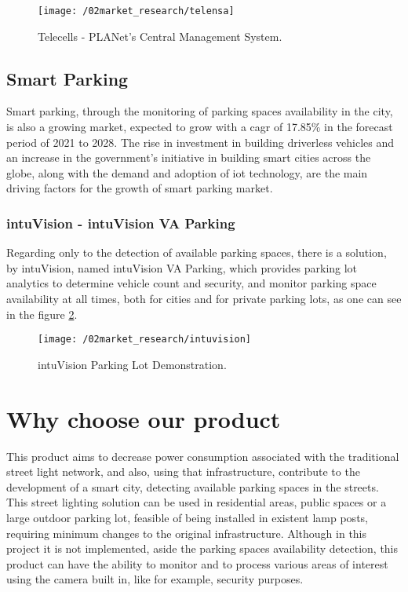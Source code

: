 \begin{figure}[ht]
	\centering
	\texttt{[image: /02market\_research/telensa]}
	\caption{Telecells - PLANet's Central Management System.}
	\label{fig:telensa}
\end{figure}

\subsection{Smart Parking}
Smart parking, through the monitoring of parking spaces availability in the city, is also a growing market, expected to grow with a \ac{cagr} of 17.85\% in the forecast period of 2021 to 2028.\cite{smart_parking_market} The rise in investment in building driverless vehicles and an increase in the government’s initiative in building smart cities across the globe, along with the demand and adoption of \ac{iot} technology, are the main driving factors for the growth of smart parking market.

\subsubsection{intuVision - intuVision VA Parking}
Regarding only to the detection of available parking spaces, there is a solution, by intuVision, named intuVision VA Parking, which provides parking lot analytics to determine vehicle count and security, and monitor parking space availability at all times, both for cities and for private parking lots, as one can see in the figure \ref{fig:intuvision}.\cite{parking}

\begin{figure}[ht]
	\centering
	\texttt{[image: /02market\_research/intuvision]}
	\caption{intuVision Parking Lot Demonstration.}
	\label{fig:intuvision}
\end{figure}

\section{Why choose our product}
This product aims to decrease power consumption associated with the traditional street light network, and also, using that infrastructure, contribute to the development of a smart city, detecting available parking spaces in the streets. This street lighting solution can be used in residential areas, public spaces or a large outdoor parking lot, feasible of being installed in existent lamp posts, requiring minimum changes to the original infrastructure. Although in this project it is not implemented, aside the parking spaces availability detection, this product can have the ability to monitor and to process various areas of interest using the camera built in, like for example, security purposes.

